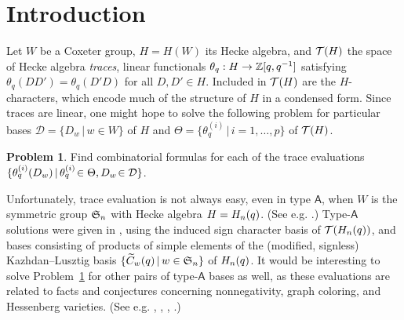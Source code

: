 \documentclass[11pt]{article}
\theoremstyle{definition}
\newtheorem{prob}[theo]{Problem}
\numberwithin{equation}{section}
\begin{document}
\newcommand{\precdot}{\prec \negthickspace \negthinspace \cdot\ }
\newcommand{\net}[2]{\mathcal F^{\mathsf{#1}}(#2)}
\newcommand{\snet}[2]{\mathcal S^{\mathsf{#1}}(#2)}
\newcommand{\znet}[2]{\mathcal S^{\mathsf{#1}}_{\mathrm Z}(#2)}
\newcommand{\dnet}[2]{\mathcal S^{\mathsf{#1}}_{\mathrm D}(#2)}
\newcommand{\sfA}{\textsf{A}}
\newcommand{\msfA}{\mathsf{A}}
\newcommand{\sfBB}{\textsf{B}}
\newcommand{\msfBB}{\mathsf{B}}
\newcommand{\sfC}{\textsf{C}}
\newcommand{\msfC}{\mathsf{C}}
\newcommand{\sfBC}{\textsf{BC}}
\newcommand{\msfBC}{\mathsf{BC}}
\newcommand{\YBCq}{Y_q^\mathsf{BC}}
\newcommand{\vertex}[1]{#1}
\newcommand{\phsum}{\phantom{\sum_A^Z}}
\newcommand{\phm}{\phantom M}
\newcommand{\phn}{\phantom{ni}}
\newcommand{\bcao}[1]{\mathcal{O}^{\msfBC}({#1})}
\newcommand{\schub}[1]{\Omega_{#1}}
\newcommand{\Aschub}[1]{\Omega_{#1}^{\msfA}}
\newcommand{\Bschub}[1]{\Omega_{#1}^{\msfBB}}
\newcommand{\Cschub}[1]{\Omega_{#1}^{\msfC}}
\newcommand{\tripprox}{\setbox0\hbox{$\approx$}%
\mbox{\makebox[0pt][l]{\raisebox{0.48\ht0}{$\approx$}}$\approx$}}
\newcommand*{\diffeo}{%
  \mathrel{\vcenter{\offinterlineskip
  \hbox{$\sim$}\vskip-.35ex\hbox{$\sim$}\vskip-.35ex\hbox{$\sim$}}}}

\theoremstyle{remark}

\section{Introduction}\label{s:intro}

Let $W$ be a Coxeter group, $H = H(W)$ its Hecke algebra, and $\mathcal{T}(H)$ the
space of Hecke algebra {\em traces},
linear functionals $\theta_q: H \rightarrow \mathbb{Z}[q, q^{-1}]$ satisfying
$\theta_q(DD') = \theta_q(D'D)$ for all $D, D' \in H$.
Included in $\mathcal{T}(H)$ are the $H$-characters,
which encode much of the structure of $H$ in a condensed form.
Since traces are linear,
one might hope to solve the
following problem for particular bases
$\mathcal D = \{ D_w \,|\, w \in W \}$ of $H$
and $\Theta = \{ \theta_q^{(i)} \,|\, i = 1,\dotsc,p \}$
of $\mathcal{T}(H)$.
\begin{prob}\label{p:evaltrace}
  Find combinatorial formulas for
  each of the trace evaluations
$\{ \theta_q^{(i)} (D_w) \,|\,
\theta_q^{(i)} \negthinspace\in \Theta, D_w \negthinspace\in \mathcal D\}$.
\end{prob}

Unfortunately, trace evaluation is not always easy,
even in type $\msfA$,
when $W$ is the symmetric group $\mathfrak{S}_n$ with Hecke algebra $H = H_n(q)$.
(See e.g. \cite[\S 1]{CHSSkanEKL}.)
Type-$\msfA$ solutions were given in
\cite{CSkanTNNChar, KLSBasesQMBIndSgn},
using the induced sign character basis of $\mathcal{T}(H_n(q))$,
and bases consisting of products of simple elements of
the (modified, signless) Kazhdan--Lusztig basis
$\{ \widetilde{C}_{w}(q) \,|\, w \in \mathfrak{S}_n \}$ of $H_n(q)$.
It would be interesting to solve Problem~\ref{p:evaltrace}
for other pairs of type-$\msfA$ bases as well, as these evaluations are related to
facts and conjectures
concerning nonnegativity,
graph coloring, and Hessenberg varieties. (See e.g.
\cite[Lem.\,1.1]{HaimanHecke},
\cite[Conj.\,2.1]{HaimanHecke},  
\cite[Conj.\,4.9]{SWachsChromQ},
\cite[Conj.\,5.5]{StanStemIJT}.)
\end{document}
